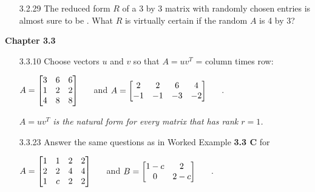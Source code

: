 \documentclass[10pt,twoside,reqno]{article}
\begin{document}
\begin{enumerate}
\item[3.2.29] The reduced form $R$ of a 3 by 3 matrix with randomly chosen entries is almost sure to be \underline{\hspace{8mm}}. What $R$ is virtually certain if the random $A$ is 4 by 3? \\
\vspace{3mm}



\end{enumerate}
\vspace{5mm}
\textbf{Chapter 3.3}
\begin{enumerate}
\item[3.3.10] Choose vectors $u$ and $v$ so that $A = uv^T$ = column times row: \\
\begin{center}
$
$$
A =
\begin{bmatrix}
3&6&6\\
1&2&2\\
4&8&8\\
\end{bmatrix}
\hspace{5mm}
$$
$
and
\hspace{5mm}
$
$$
A = 
\begin{bmatrix}
2&2&6&4\\
-1&-1&-3&-2\\
\end{bmatrix}
\hspace{5mm}
$$
$
. \\
\end{center}
\textit{$A = uv^T$ is the natural form for every matrix that has rank $r = 1$.}
\vspace{3mm}



\item[3.3.23] Answer the same questions as in Worked Example \textbf{3.3 C} for \\
\begin{center}
$
$$
A =
\begin{bmatrix}
1&1&2&2\\
2&2&4&4\\
1&c&2&2\\
\end{bmatrix}
\hspace{5mm}
$$
$
and
\hspace{5mm}
$
$$
B = 
\begin{bmatrix}
1-c&2\\
0&2-c\\
\end{bmatrix}
\hspace{5mm}
$$
$
. \\
\end{center}
\vspace{3mm}




\end{enumerate}
\end{document}
